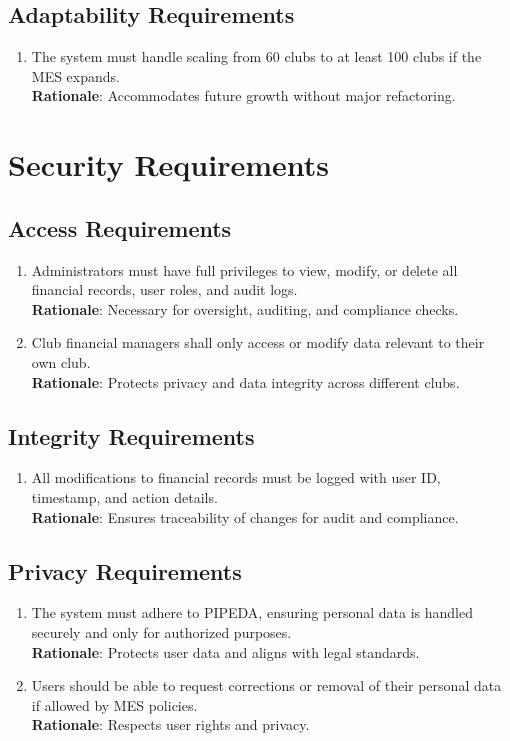 \documentclass[12pt]{article}
\begin{document}
\subsection{Adaptability Requirements}
\begin{enumerate}
  \item The system must handle scaling from 60 clubs to at least 100 clubs if the MES expands. \\
  \textbf{Rationale}: Accommodates future growth without major refactoring.
\end{enumerate}

\section{Security Requirements}
\subsection{Access Requirements}
\begin{enumerate}
  \item Administrators must have full privileges to view, modify, or delete all financial records, user roles, and audit logs. \\
  \textbf{Rationale}: Necessary for oversight, auditing, and compliance checks.
  \item Club financial managers shall only access or modify data relevant to their own club. \\
  \textbf{Rationale}: Protects privacy and data integrity across different clubs.
\end{enumerate}

\subsection{Integrity Requirements}
\begin{enumerate}
  \item All modifications to financial records must be logged with user ID, timestamp, and action details. \\
  \textbf{Rationale}: Ensures traceability of changes for audit and compliance.
\end{enumerate}

\subsection{Privacy Requirements}
\begin{enumerate}
  \item The system must adhere to PIPEDA, ensuring personal data is handled securely and only for authorized purposes. \\
  \textbf{Rationale}: Protects user data and aligns with legal standards.
  \item Users should be able to request corrections or removal of their personal data if allowed by MES policies. \\
  \textbf{Rationale}: Respects user rights and privacy.
\end{enumerate}
\end{document}
